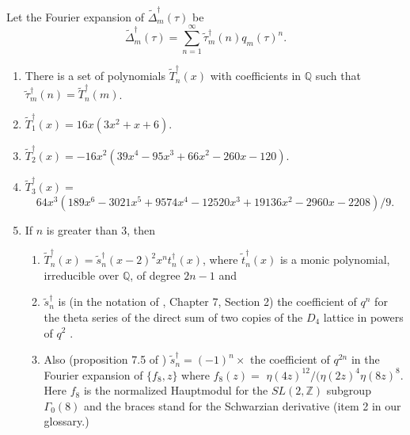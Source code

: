 \documentclass{article}
\begin{document}
\begin{conjecture}
Let the Fourier
expansion of $\widetilde{\Delta}^{\dagger}_m(\tau)$ be
$$
\widetilde{\Delta}^{\dagger}_m(\tau) = 
\sum_{n=1}^{\infty}  \tilde{\tau}_m^{\dagger}(n) q_m(\tau)^n.
$$
\begin{enumerate}
\item There is a set of polynomials
$\widetilde{T}^{\dagger}_n(x)$
with coefficients in $\mathbb{Q}$ such that 
$\tilde{\tau}_m^{\dagger}(n) = 
\widetilde{T}^{\dagger}_n(m)$.
\item  $\widetilde{T}^{\dagger}_1(x) = 16x(3x^2+x+6)$.
\item $\widetilde{T}^{\dagger}_2(x) = 
-16x^2(39x^4-95x^3+66x^2-260x-120)$.
\item  $\widetilde{T}^{\dagger}_3(x) = $
$$64x^3(189x^6-3021x^5+9574x^4
-12520x^3+19136x^2-2960x-2208)/9.$$
    \item If $n$ is greater than $3$,
then \begin{enumerate}
\item $\widetilde{T}^{\dagger}_n(x) = 
\tilde{s}^{\dagger}_n
(x-2)^2 x^n t^{\dagger}_n(x)$,
where $\tilde{t}^{\dagger}_n(x)$ is 
a monic polynomial, 
irreducible
over $\mathbb{Q}$,
of degree $2n - 1$ and
\item
$\tilde{s}^{\dagger}_n$ is 
(in the notation of \cite{conway2013sphere},
 Chapter 7, Section 2) 
  the coefficient of
  $q^n$
 for the theta series of the
 direct sum of two copies of the
 $D_4$ lattice in powers of $q^2$
 \cite{OEIS5}. 
 \item Also  (proposition 7.5 of \cite{doi})
 $\tilde{s}^{\dagger}_n = 
 (-1)^n \times$  the coefficient of $q^{2n}$
 in the Fourier expansion of
 $\{f_8,z\}$ where $f_8(z) = $
 \newline
 $\eta(4z)^{12}/(\eta(2z)^4 \eta(8z)^8$.
 Here $f_8$ is the normalized Hauptmodul
 for the $SL(2,\mathbb{Z})$ subgroup
 $\Gamma_0(8)$ and the braces stand for the
 Schwarzian derivative
 (item 2 in our glossary.)
\end{enumerate}
\end{enumerate}
\end{conjecture}
\end{document}
